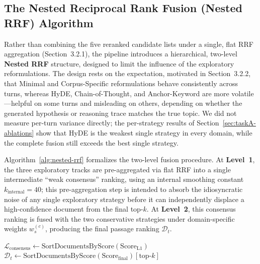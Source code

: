 \subsection{The Nested Reciprocal Rank Fusion (Nested RRF) Algorithm}
\label{subsec:nested-rrf}

Rather than combining the five reranked candidate lists under a single, flat RRF aggregation (Section~3.2.1), the pipeline introduces a hierarchical, two-level \textbf{Nested RRF} structure, designed to limit the influence of the exploratory reformulations. The design rests on the expectation, motivated in Section~3.2.2, that Minimal and Corpus-Specific reformulations behave consistently across turns, whereas HyDE, Chain-of-Thought, and Anchor-Keyword are more volatile---helpful on some turns and misleading on others, depending on whether the generated hypothesis or reasoning trace matches the true topic. We did not measure per-turn variance directly; the per-strategy results of Section~\ref{sec:taskA-ablations} show that HyDE is the weakest single strategy in every domain, while the complete fusion still exceeds the best single strategy.

Algorithm~\ref{alg:nested-rrf} formalizes the two-level fusion procedure. At \textbf{Level~1}, the three exploratory tracks are pre-aggregated via flat RRF into a single intermediate ``weak consensus'' ranking, using an internal smoothing constant $k_{\text{internal}}{=}40$; this pre-aggregation step is intended to absorb the idiosyncratic noise of any single exploratory strategy before it can independently displace a high-confidence document from the final top-$k$. At \textbf{Level~2}, this consensus ranking is fused with the two conservative strategies under domain-specific weights $w_s^{(c)}$, producing the final passage ranking $\mathcal{D}_t$.

\begin{algorithm}[h]
\caption{Nested Reciprocal Rank Fusion}
\label{alg:nested-rrf}
$\mathcal{L}_{\text{consensus}} \gets \text{SortDocumentsByScore}(\text{Score}_{\text{L1}})$\;
$\mathcal{D}_t \gets \text{SortDocumentsByScore}(\text{Score}_{\text{final}})[\text{top-}k]$\;
\end{algorithm}

